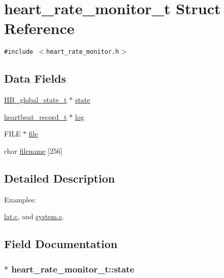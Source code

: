 \hypertarget{structheart__rate__monitor__t}{
\section{heart\_\-rate\_\-monitor\_\-t Struct Reference}
\label{structheart__rate__monitor__t}
}
{\tt \#include $<$heart\_\-rate\_\-monitor.h$>$}

\subsection*{Data Fields}
\begin{CompactItemize}
\item 
\hyperlink{structHB__global__state__t}{HB\_\-global\_\-state\_\-t} $\ast$ \hyperlink{structheart__rate__monitor__t_31fd34018c3699f1390f06d6c09d6559}{state}
\item 
\hyperlink{structheartbeat__record__t}{heartbeat\_\-record\_\-t} $\ast$ \hyperlink{structheart__rate__monitor__t_d4b0199634440986b04f40426e6cb283}{log}
\item 
FILE $\ast$ \hyperlink{structheart__rate__monitor__t_4c087bccf088749e63bdca77652abe2d}{file}
\item 
char \hyperlink{structheart__rate__monitor__t_20fcde7164313c4b95089a9a935091ac}{filename} \mbox{[}256\mbox{]}
\end{CompactItemize}


\subsection{Detailed Description}
\begin{Desc}
\item[Examples: ]\par


\hyperlink{lat_8c-example}{lat.c}, and \hyperlink{system_8c-example}{system.c}.\end{Desc}


\subsection{Field Documentation}
\hypertarget{structheart__rate__monitor__t_31fd34018c3699f1390f06d6c09d6559}{
\subsubsection[state]{$\ast$ {\bf heart\_\-rate\_\-monitor\_\-t::state}}}
\label{structheart__rate__monitor__t_31fd34018c3699f1390f06d6c09d6559}


